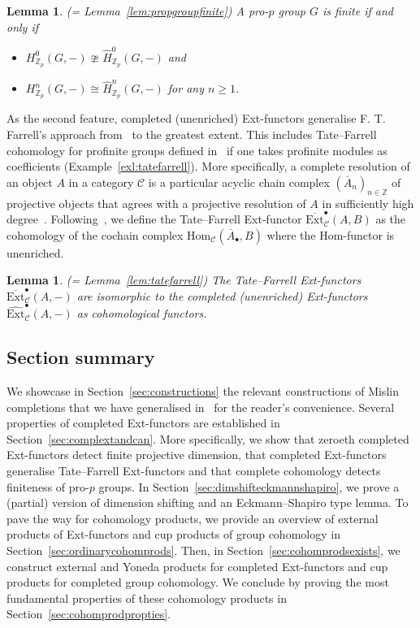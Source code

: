 \documentclass[12pt, a4paper]{article}
\numberwithin{equation}{section}
\newtheorem{lem}[thm]{Lemma}
\theoremstyle{empty}
\theoremstyle{nonumberplain}
\begin{document}
\begin{lem} (= Lemma~\ref{lem:propgroupfinite})
A pro-$p$ group $G$ is finite if and only if
\begin{itemize}
\item $H_{\mathbb{Z}_p}^0(G, -) \ncong \widehat{H}_{\mathbb{Z}_p}^0(G, -)$ and
\item $H_{\mathbb{Z}_p}^n(G, -) \cong \widehat{H}_{\mathbb{Z}_p}^n(G, -)$ for any $n \geq 1$.
\end{itemize}
\end{lem}

As the second feature, completed (unenriched) Ext-functors generalise F.\! T.\! Farrell's approach from~\cite{far77} to the greatest extent. This includes Tate--Farrell cohomology for profinite groups defined in~\cite[p.~34]{sym07} if one takes profinite modules as coefficients (Example~\ref{exl:tatefarrell}). More specifically, a complete resolution of an object $A$ in a category $\mathcal{C}$ is a particular acyclic chain complex $(\overline{A}_n)_{n \in \mathbb{Z}}$ of projective objects that agrees with a projective resolution of $A$ in sufficiently high degree~\cite[Definition~1.1]{cor97}. Following~\cite[p.~158]{far77}, we define the Tate--Farrell Ext-functor $\overline{\mathrm{Ext}}_{\mathcal{C}}^{\bullet}(A, B)$ as the cohomology of the cochain complex $\mathrm{Hom}_{\mathcal{C}}(\overline{A}_{\bullet}, B)$ where the Hom-functor is unenriched.

\begin{lem} (= Lemma~\ref{lem:tatefarrell})
The Tate--Farrell Ext-functors $\overline{\mathrm{Ext}}_{\mathcal{C}}^{\bullet}(A, -)$ are isomorphic to the completed (unenriched) Ext-functors $\widehat{\mathrm{Ext}}_{\mathcal{C}}^{\bullet}(A, -)$ as cohomological functors.
\end{lem}

\subsection{Section summary}

We showcase in Section~\ref{sec:constructions} the relevant constructions of Mislin completions that we have generalised in~\cite{ghe24} for the reader's convenience. Several properties of completed Ext-functors are established in Section~\ref{sec:complextandcan}. More specifically, we show that zeroeth completed Ext-functors detect finite projective dimension, that completed Ext-functors generalise Tate--Farrell Ext-functors and that complete cohomology detects finiteness of pro-$p$ groups. In Section~\ref{sec:dimshifteckmannshapiro}, we prove a (partial) version of dimension shifting and an Eckmann--Shapiro type lemma. To pave the way for cohomology products, we provide an overview of external products of Ext-functors and cup products of group cohomology in Section~\ref{sec:ordinarycohomprods}. Then, in Section~\ref{sec:cohomprodsexists}, we construct external and Yoneda products for completed Ext-functors and cup products for completed group cohomology. We conclude by proving the most fundamental properties of these cohomology products in Section~\ref{sec:cohomprodpropties}.
\end{document}
